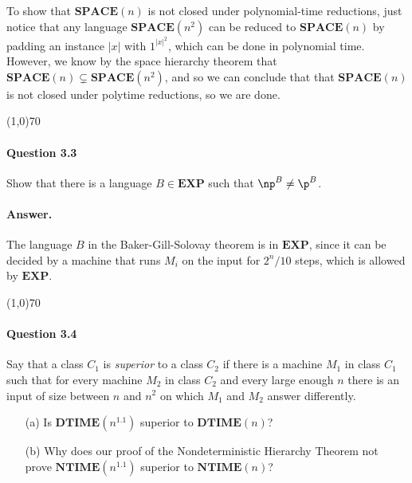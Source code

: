 To show that $\mathbf{SPACE}(n)$ is not closed under polynomial-time reductions, just notice that any language $\mathbf{SPACE}(n^2)$ can be reduced to $\mathbf{SPACE}(n)$ by padding an instance $|x|$ with $1^{|x|^2}$, which can be done in polynomial time. However, we know by the space hierarchy theorem that $\mathbf{SPACE}(n)\subsetneq\mathbf{SPACE}(n^2)$, and so we can conclude that that $\mathbf{SPACE}(n)$ is not closed under polytime reductions, so we are done.

\begin{center}
	\line(1,0){70}
\end{center}

\paragraph{Question 3.3} Show that there is a language $B\in\mathbf{EXP}$ such that $\np^B\neq\p^B$.

\paragraph{Answer.} The language $B$ in the Baker-Gill-Solovay theorem is in $\mathbf{EXP}$, since it can be decided by a machine that runs $M_i$ on the input for $2^n/10$ steps, which is allowed by $\mathbf{EXP}$.

\begin{center}
	\line(1,0){70}
\end{center}

\paragraph{Question 3.4} Say that a class $C_1$ is \textit{superior} to a class $C_2$ if there is a machine $M_1$ in class $C_1$ such that for every machine $M_2$ in class $C_2$ and every large enough $n$ there is an input of size between $n$ and $n^2$ on which $M_1$ and $M_2$ answer differently.
\begin{enumerate}
	\item[(a)] Is $\mathbf{DTIME}(n^{1.1})$ superior to $\mathbf{DTIME}(n)$?
	\item[(b)] Why does our proof of the Nondeterministic Hierarchy Theorem not prove $\mathbf{NTIME}(n^{1.1})$ superior to $\mathbf{NTIME}(n)$?
\end{enumerate}

